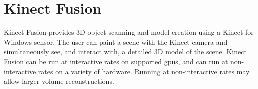 \section{Kinect Fusion}
\label{sec:fusion}

Kinect Fusion provides 3D object scanning and model creation using a Kinect for Windows sensor. The user can paint a scene with the Kinect camera and simultaneously see, and interact with, a detailed 3D model of the scene. Kinect Fusion can be run at interactive rates on supported \glspl{gpu}, and can run at non-interactive rates on a variety of hardware. Running at non-interactive rates may allow larger volume reconstructions.





